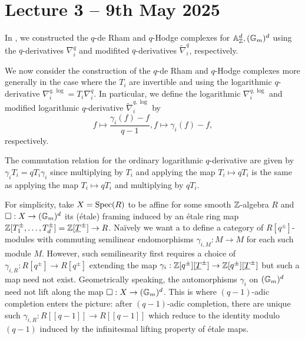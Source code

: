 \section{Lecture 3 -- 9th May 2025}\label{sec: lecture 3}
In , we constructed the $q$-de Rham and $q$-Hodge complexes for $\mathbb{A}^{d}_{\mathbb{Z}},(\mathbb{G}_{m})^{d}$ using the $q$-derivatives $\nabla_{i}^{q}$ and modifited $q$-derivatives $\widetilde{\nabla}_{i}^{q}$, respectively. 

We now consider the construction of the $q$-de Rham and $q$-Hodge complexes more generally in the case where the $T_{i}$ are invertible and using the logarithmic $q$-derivative $\nabla_{i}^{q,\log}=T_{i}\nabla_{i}^{q}$. In particular, we define the logarithmic $\nabla^{q,\log}_{i}$ and modified logarithmic $q$-derivative $\widetilde{\nabla}^{q,\log}_{i}$ by
$$f\mapsto\frac{\gamma_{i}(f)-f}{q-1}, f\mapsto\gamma_{i}(f)-f,$$
respectively. 
\begin{remark}
    The commutation relation for the ordinary logarithmic $q$-derivative are given by $\gamma_{i}T_{i}=qT_{i}\gamma_{i}$ since multiplying by $T_{i}$ and applying the map $T_{i}\mapsto qT_{i}$ is the same as applying the map $T_{i}\mapsto qT_{i}$ and multiplying by $qT_{i}$. 
\end{remark}
For simplicity, take $X=\operatorname{Spec}(R)$ to be affine for some smooth $\mathbb{Z}$-algebra $R$ and $\square:X\to(\mathbb{G}_{m})^{d}$ its (\'{e}tale) framing induced by an \'{e}tale ring map $\mathbb{Z}[T_{1}^{\pm},\dots,T_{d}^{\pm}]=\mathbb{Z}[\underline{T}^{\pm}]\to R$. Na\"{i}vely we want a to define a category of $R[q^{\pm}]$-modules with commuting semilinear endomorphisms $\gamma_{i,M}:M\to M$ for each such module $M$. However, such semilinearity first requires a choice of $\gamma_{i,R}:R[q^{\pm}]\to R[q^{\pm}]$ extending the map $\gamma_{i}:\mathbb{Z}[q^{\pm}][\underline{T}^{\pm}]\to\mathbb{Z}[q^{\pm}][\underline{T}^{\pm}]$ but such a map need not exist. Geometrically speaking, the automorphisms $\gamma_{i}$ on $(\mathbb{G}_{m})^{d}$ need not lift along the map $\square:X\to(\mathbb{G}_{m})^{d}$. This is where $(q-1)$-adic completion enters the picture: after $(q-1)$-adic completion, there are unique such $\gamma_{i,R}:R[[q-1]]\to R[[q-1]]$ which reduce to the identity modulo $(q-1)$ induced by the infinitesmal lifting property of \'{e}tale maps. 

